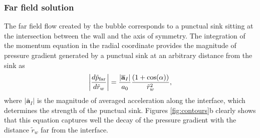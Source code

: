 \documentclass[final]{jfm}
\begin{document}
\subsubsection{Far field solution}
The far field flow created by the bubble corresponds to a punctual sink sitting at the intersection between the wall and the axis of symmetry. The integration of the momentum equation in the radial coordinate provides the magnitude of pressure gradient generated by a punctual sink at an arbitrary distance from the sink as
\begin{equation}
\left| \frac{d\tilde{p}_{\rm{far}}}{d\tilde{r}_w} \right| = \frac{\vert \overline{\mathbf a}_I \vert}{a_0} \frac{(1 + \cos(\alpha))}{\tilde{r}^2_w}, %
\label{eq:farfieldfit}
\end{equation} 
where  $\vert \overline{\mathbf a}_I \vert$ is the magnitude of averaged acceleration along the interface, which determines the strength of the punctual sink. Figures \ref{fig:contours}b clearly shows that this equation captures well the decay of the pressure gradient with the distance $\tilde{r}_w$ far from the interface.
\end{document}
